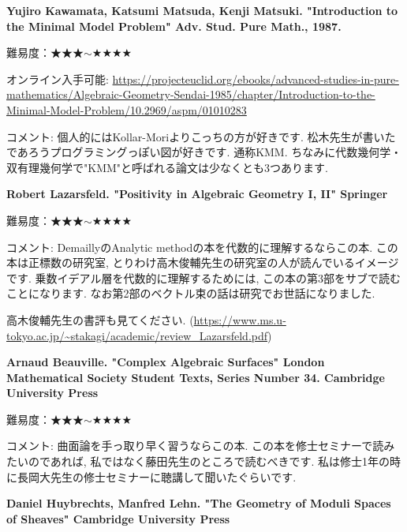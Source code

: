 \textbf{Yujiro Kawamata, Katsumi Matsuda, Kenji Matsuki. "Introduction to the Minimal Model Problem" Adv. Stud. Pure Math., 1987. } \vspace{-6pt}

難易度：★★★$\sim$★★★★\vspace{-6pt} 

オンライン入手可能: 
\url{https://projecteuclid.org/ebooks/advanced-studies-in-pure-mathematics/Algebraic-Geometry-Sendai-1985/chapter/Introduction-to-the-Minimal-Model-Problem/10.2969/aspm/01010283} 
\vspace{-6pt}

コメント: 個人的にはKollar-Moriよりこっちの方が好きです. 松木先生が書いたであろうプログラミングっぽい図が好きです. 通称KMM. ちなみに代数幾何学・双有理幾何学で"KMM"と呼ばれる論文は少なくとも3つあります. 
\vspace{8pt}

\textbf{Robert Lazarsfeld. "Positivity in Algebraic Geometry I, II" Springer} \vspace{-6pt}

難易度：★★★$\sim$★★★★\vspace{-6pt} 

コメント: DemaillyのAnalytic methodの本を代数的に理解するならこの本. この本は正標数の研究室, とりわけ高木俊輔先生の研究室の人が読んでいるイメージです. 乗数イデアル層を代数的に理解するためには, この本の第3部をサブで読むことになります. なお第2部のベクトル束の話は研究でお世話になりました. 

高木俊輔先生の書評も見てください. (\url{https://www.ms.u-tokyo.ac.jp/~stakagi/academic/review_Lazarsfeld.pdf})
\vspace{8pt}


\textbf{Arnaud Beauville. "Complex Algebraic Surfaces" London Mathematical Society Student Texts, Series Number 34. Cambridge University Press} \vspace{-6pt}

難易度：★★★$\sim$★★★★\vspace{-6pt} 

コメント: 曲面論を手っ取り早く習うならこの本. この本を修士セミナーで読みたいのであれば, 私ではなく藤田先生のところで読むべきです. 私は修士1年の時に長岡大先生の修士セミナーに聴講して聞いたぐらいです. 
\vspace{8pt}

\textbf{Daniel Huybrechts, Manfred Lehn. "The Geometry of Moduli Spaces of Sheaves" Cambridge University Press} \vspace{-6pt}

